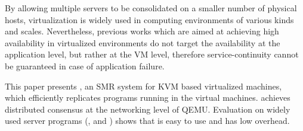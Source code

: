 By allowing multiple servers to be consolidated on a smaller number of physical 
hosts, virtualization is widely used in computing environments of various kinds and
scales. Nevertheless, previous works which are aimed at achieving high availability 
in virtualized environments do not target the availability at the application level, 
but rather at the VM level, therefore service-continuity cannot be guaranteed in case 
of application failure.

This paper presents \xxx, an SMR system for KVM based virtualized machines, 
which efficiently replicates programs running in the virtual machines. 
\xxx achieves distributed consensus at the networking level of QEMU. 
Evaluation on \nprog widely used server programs (\eg, \mysql and \redis) shows 
that \xxx is easy to use and has low overhead.
